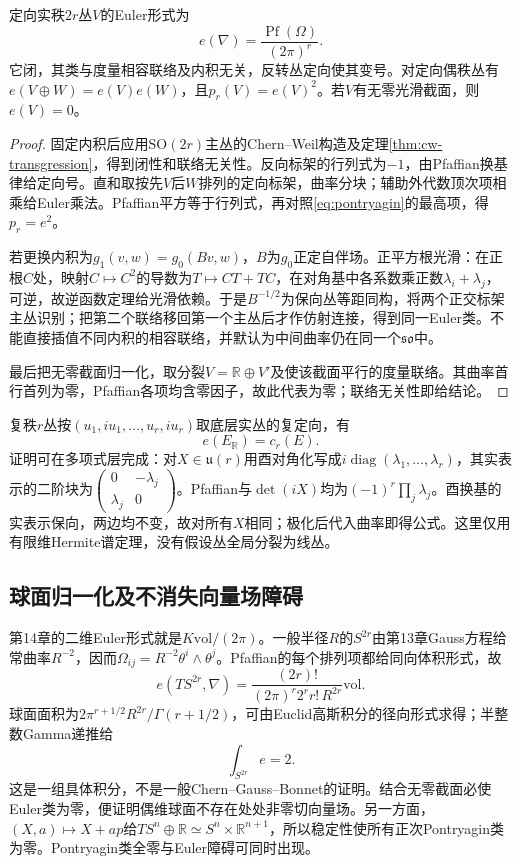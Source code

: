 \begin{theorem}\label{thm:euler-form}
定向实秩$2r$丛$V$的Euler形式为
\begin{equation}\label{eq:euler-form}
 e(\nabla)=\frac{\operatorname{Pf}(\Omega)}{(2\pi)^r}.
\end{equation}
它闭，其类与度量相容联络及内积无关，反转丛定向使其变号。对定向偶秩丛有$e(V\oplus W)=e(V)e(W)$，且$p_r(V)=e(V)^2$。若$V$有无零光滑截面，则$e(V)=0$。
\end{theorem}
\begin{proof}
固定内积后应用$\mathrm{SO}(2r)$主丛的Chern--Weil构造及定理\ref{thm:cw-transgression}，得到闭性和联络无关性。反向标架的行列式为$-1$，由Pfaffian换基律给定向号。直和取按先$V$后$W$排列的定向标架，曲率分块；辅助外代数顶次项相乘给Euler乘法。Pfaffian平方等于行列式，再对照\eqref{eq:pontryagin}的最高项，得$p_r=e^2$。

若更换内积为$g_1(v,w)=g_0(Bv,w)$，$B$为$g_0$正定自伴场。正平方根光滑：在正根$C$处，映射$C\mapsto C^2$的导数为$T\mapsto CT+TC$，在对角基中各系数乘正数$\lambda_i+\lambda_j$，可逆，故逆函数定理给光滑依赖。于是$B^{-1/2}$为保向丛等距同构，将两个正交标架主丛识别；把第二个联络移回第一个主丛后才作仿射连接，得到同一Euler类。不能直接插值不同内积的相容联络，并默认为中间曲率仍在同一个$\mathfrak{so}$中。

最后把无零截面归一化，取分裂$V=\mathbb R\oplus V'$及使该截面平行的度量联络。其曲率首行首列为零，Pfaffian各项均含零因子，故此代表为零；联络无关性即给结论。
\end{proof}
复秩$r$丛按$(u_1,iu_1,\ldots,u_r,iu_r)$取底层实丛的复定向，有
\begin{equation}\label{eq:euler-top-chern}
 e(E_{\mathbb R})=c_r(E).
\end{equation}
证明可在多项式层完成：对$X\in\mathfrak u(r)$用酉对角化写成$i\operatorname{diag}(\lambda_1,\ldots,\lambda_r)$，其实表示的二阶块为$\left(\begin{smallmatrix}0&-\lambda_j\\\lambda_j&0\end{smallmatrix}\right)$。Pfaffian与$\det(iX)$均为$(-1)^r\prod_j\lambda_j$。酉换基的实表示保向，两边均不变，故对所有$X$相同；极化后代入曲率即得公式。这里仅用有限维Hermite谱定理，没有假设丛全局分裂为线丛。

\subsection{球面归一化及不消失向量场障碍}
第14章的二维Euler形式就是$K\mathrm{vol}/(2\pi)$。一般半径$R$的$S^{2r}$由第13章Gauss方程给常曲率$R^{-2}$，因而$\Omega_{ij}=R^{-2}\theta^i\wedge\theta^j$。Pfaffian的每个排列项都给同向体积形式，故
\[
 e(TS^{2r},\nabla)=
 \frac{(2r)!}{(2\pi)^r2^r r!\,R^{2r}}\mathrm{vol}.
\]
球面面积为$2\pi^{r+1/2}R^{2r}/\Gamma(r+1/2)$，可由Euclid高斯积分的径向形式求得；半整数Gamma递推给
\[
 \int_{S^{2r}}e=2.
\]
这是一组具体积分，不是一般Chern--Gauss--Bonnet的证明。结合无零截面必使Euler类为零，便证明偶维球面不存在处处非零切向量场。另一方面，$(X,a)\mapsto X+ap$给$TS^n\oplus\mathbb R\simeq S^n\times\mathbb R^{n+1}$，所以稳定性使所有正次Pontryagin类为零。Pontryagin类全零与Euler障碍可同时出现。
